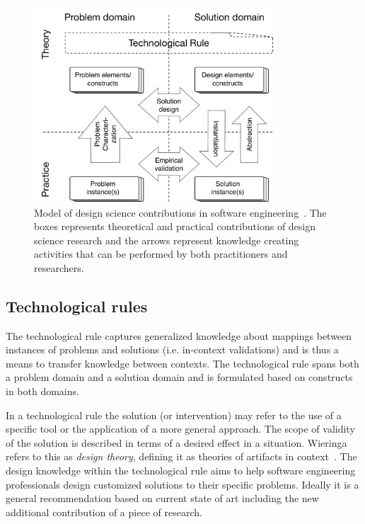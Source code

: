 \documentclass[graybox]{svmult}
\begin{document}
\begin{figure}
  \includegraphics[width=0.8\textwidth]{Figures/DS_model.pdf}
\caption{Model of design science contributions in software engineering~\cite{Engstrom19arxiv}. The boxes represents theoretical and practical contributions of design science research and the arrows represent knowledge creating activities that can be performed by both practitioners and researchers.}
\label{fig:DS_model}       %
\end{figure}



\subsection{Technological rules}
\label{sec:technologicalrules}



The technological rule captures generalized knowledge about mappings between instances of problems and solutions (i.e. in-context validations) and is thus a means to transfer knowledge between contexts. The technological rule spans both a problem domain and a solution domain and is formulated based on constructs in both domains. 

In a technological rule the solution (or intervention) may refer to the use of a specific tool or the application of a more general approach. The scope of validity of the solution is described in terms of a desired effect in a situation.  Wieringa refers to this as \emph{design theory}, defining it as theories of artifacts in context~\cite{wieringa_design_2009}. The design knowledge within the technological rule aims to help software engineering professionals design customized solutions to their specific problems. Ideally it is a general recommendation based on current state of art including the new additional contribution of a piece of research.
\end{document}
